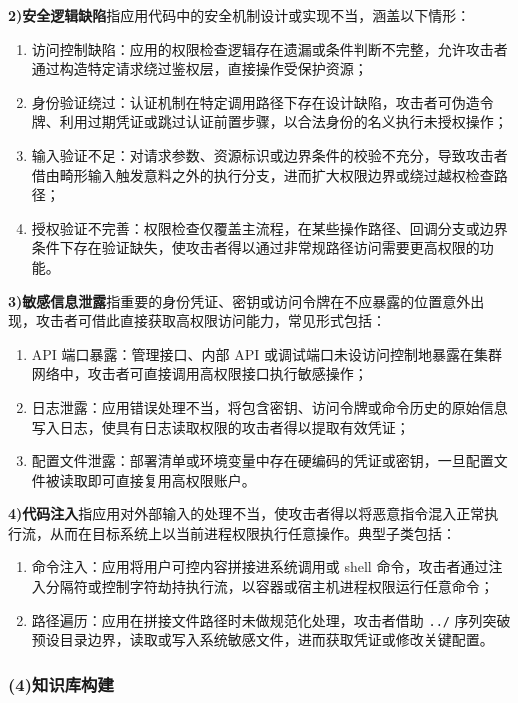 \textbf{2)安全逻辑缺陷}指应用代码中的安全机制设计或实现不当，涵盖以下情形：
\begin{enumerate}[label=\textcircled{\small\arabic*},leftmargin=*]
    \item 访问控制缺陷：应用的权限检查逻辑存在遗漏或条件判断不完整，允许攻击者通过构造特定请求绕过鉴权层，直接操作受保护资源；
    \item 身份验证绕过：认证机制在特定调用路径下存在设计缺陷，攻击者可伪造令牌、利用过期凭证或跳过认证前置步骤，以合法身份的名义执行未授权操作；
    \item 输入验证不足：对请求参数、资源标识或边界条件的校验不充分，导致攻击者借由畸形输入触发意料之外的执行分支，进而扩大权限边界或绕过越权检查路径；
    \item 授权验证不完善：权限检查仅覆盖主流程，在某些操作路径、回调分支或边界条件下存在验证缺失，使攻击者得以通过非常规路径访问需要更高权限的功能。
\end{enumerate}

\textbf{3)敏感信息泄露}指重要的身份凭证、密钥或访问令牌在不应暴露的位置意外出现，攻击者可借此直接获取高权限访问能力，常见形式包括：
\begin{enumerate}[label=\textcircled{\small\arabic*},leftmargin=*]
    \item API 端口暴露：管理接口、内部 API 或调试端口未设访问控制地暴露在集群网络中，攻击者可直接调用高权限接口执行敏感操作；
    \item 日志泄露：应用错误处理不当，将包含密钥、访问令牌或命令历史的原始信息写入日志，使具有日志读取权限的攻击者得以提取有效凭证；
    \item 配置文件泄露：部署清单或环境变量中存在硬编码的凭证或密钥，一旦配置文件被读取即可直接复用高权限账户。
\end{enumerate}

\textbf{4)代码注入}指应用对外部输入的处理不当，使攻击者得以将恶意指令混入正常执行流，从而在目标系统上以当前进程权限执行任意操作。典型子类包括：
\begin{enumerate}[label=\textcircled{\small\arabic*},leftmargin=*]
    \item 命令注入：应用将用户可控内容拼接进系统调用或 shell 命令，攻击者通过注入分隔符或控制字符劫持执行流，以容器或宿主机进程权限运行任意命令；
    \item 路径遍历：应用在拼接文件路径时未做规范化处理，攻击者借助 \texttt{../} 序列突破预设目录边界，读取或写入系统敏感文件，进而获取凭证或修改关键配置。
\end{enumerate}

\subsubsection{(4)知识库构建}


